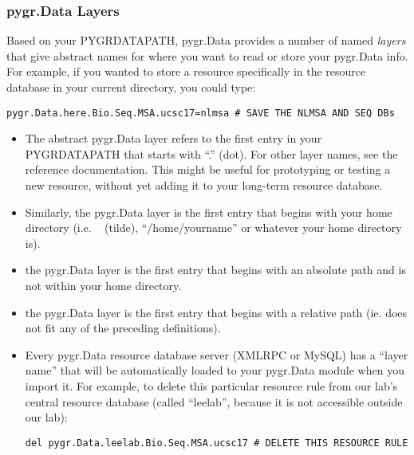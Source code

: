 \documentclass{howto}
\begin{document}
\subsubsection{pygr.Data Layers}
Based on your PYGRDATAPATH, pygr.Data provides a number of named {\em layers}
that give abstract names for where you want to read or store your pygr.Data info.
For example, if you wanted to store a resource specifically in the resource
database in your current directory, you could type:
\begin{verbatim}
pygr.Data.here.Bio.Seq.MSA.ucsc17=nlmsa # SAVE THE NLMSA AND SEQ DBs
\end{verbatim}
\begin{itemize}
\item The abstract pygr.Data layer  refers to the first entry in your
PYGRDATAPATH that starts with ``.'' (dot).  For other layer names, see
the reference documentation.  This might be useful for prototyping or
testing a new resource, without yet adding it to your long-term resource
database.

\item Similarly, the pygr.Data layer
 is the first entry that begins with your home directory
(i.e. ~ (tilde), ``/home/yourname'' or whatever your home directory is).

\item the pygr.Data layer  is the first entry that
begins with an absolute path and is not within your home directory.

\item the pygr.Data layer  is the first entry that
begins with a relative path (ie. does not fit any of the preceding
definitions).

\item Every pygr.Data resource database server (XMLRPC or MySQL) has
a ``layer name'' that will be automatically loaded to your pygr.Data module
when you import it.  For example, to delete this particular resource rule
from our lab's central resource database (called ``leelab'', because it is
not accessible outside our lab):
\begin{verbatim}
del pygr.Data.leelab.Bio.Seq.MSA.ucsc17 # DELETE THIS RESOURCE RULE
\end{verbatim}
\end{itemize}
\end{document}
